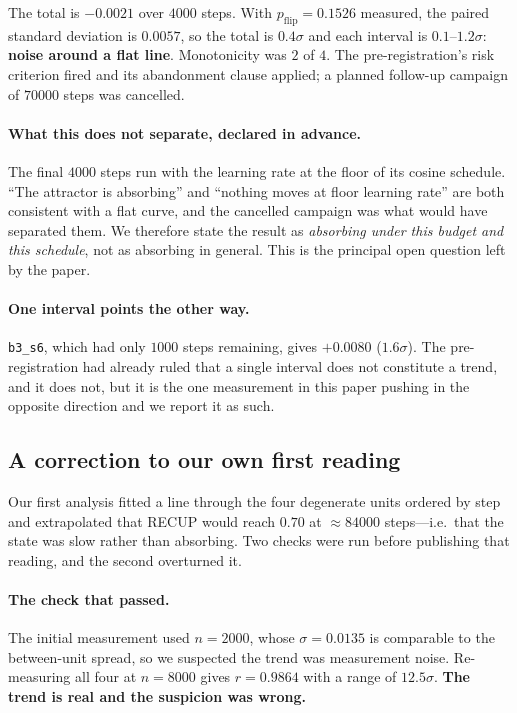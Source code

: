 \documentclass[11pt]{article}
\begin{document}
The total is $\mathbf{-0.0021}$ over $4000$ steps. With $p_{\mathrm{flip}} = 0.1526$ measured, the
paired standard deviation is $0.0057$, so the total is $0.4\sigma$ and each interval is $0.1$--$1.2\sigma$:
\textbf{noise around a flat line}. Monotonicity was $2$ of $4$. The pre-registration's risk criterion
fired and its abandonment clause applied; a planned follow-up campaign of $70000$ steps was
cancelled.

\paragraph{What this does not separate, declared in advance.} The final $4000$ steps run with the
learning rate at the floor of its cosine schedule. ``The attractor is absorbing'' and ``nothing moves
at floor learning rate'' are both consistent with a flat curve, and the cancelled campaign was what
would have separated them. We therefore state the result as \emph{absorbing under this budget and
this schedule}, not as absorbing in general. This is the principal open question left by the paper.

\paragraph{One interval points the other way.} \texttt{b3\_s6}, which had only $1000$ steps
remaining, gives $+0.0080$ ($1.6\sigma$). The pre-registration had already ruled that a single
interval does not constitute a trend, and it does not, but it is the one measurement in this paper
pushing in the opposite direction and we report it as such.

\subsection{A correction to our own first reading}
\label{sec:correccion}

Our first analysis fitted a line through the four degenerate units ordered by step and extrapolated
that RECUP would reach $0.70$ at $\approx 84000$ steps---i.e.\ that the state was slow rather than
absorbing. Two checks were run before publishing that reading, and the second overturned it.

\paragraph{The check that passed.} The initial measurement used $n=2000$, whose $\sigma = 0.0135$ is
comparable to the between-unit spread, so we suspected the trend was measurement noise. Re-measuring
all four at $n=8000$ gives $r = 0.9864$ with a range of $12.5\sigma$. \textbf{The trend is real and
the suspicion was wrong.}
\end{document}
